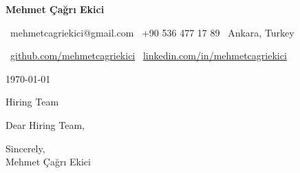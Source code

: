\documentclass[11pt,a4paper]{article}
\begin{document}
{\Huge\bfseries\color{accent} Mehmet Çağrı Ekici}

\vspace{4pt}
\faEnvelope\ mehmetcagriekici@gmail.com \quad
\faPhone\ +90 536 477 17 89 \quad
\faMapMarker\ Ankara, Turkey

\faGithub\ \href{https://github.com/mehmetcagriekici}{github.com/mehmetcagriekici} \quad
\faLinkedin\ \href{https://linkedin.com/in/mehmetcagriekici}{linkedin.com/in/mehmetcagriekici}

\vspace{12pt}

\today

\vspace{12pt}

Hiring Team

\vspace{12pt}

Dear Hiring Team,

%
%
%
%
%

\vspace{12pt}

Sincerely,\\
Mehmet Çağrı Ekici
\end{document}
